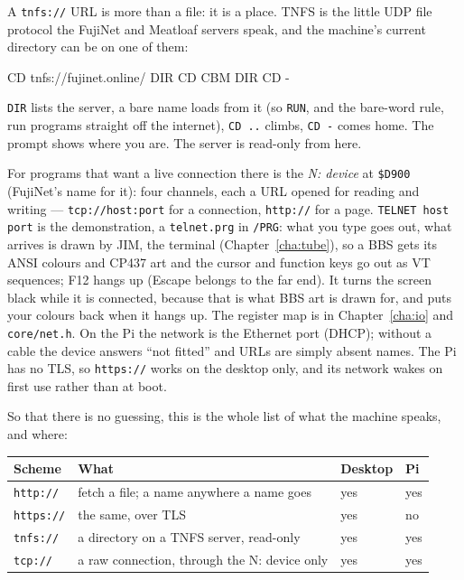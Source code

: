 A \texttt{tnfs://} URL is more than a file: it is a place. TNFS is the
little UDP file protocol the FujiNet and Meatloaf servers speak, and the
machine's current directory can be on one of them:

\begin{type}
CD tnfs://fujinet.online/
DIR
CD CBM
DIR
CD -
\end{type}

\verb|DIR| lists the server, a bare name loads from it (so \verb|RUN|, and
the bare-word rule, run programs straight off the internet), \verb|CD ..|
climbs, \verb|CD -| comes home. The prompt shows where you are. The server
is read-only from here.

For programs that want a live connection there is the \emph{N: device}
at \texttt{\$D900} (FujiNet's name for it): four channels, each a URL
opened for reading and writing --- \texttt{tcp://host:port} for a
connection, \texttt{http://} for a page. \verb|TELNET host port| is the
demonstration, a \texttt{telnet.prg} in \texttt{/PRG}: what you type goes
out, what arrives is drawn by JIM, the terminal (Chapter~\ref{cha:tube}),
so a BBS gets its ANSI colours and CP437 art and the cursor and function
keys go out as VT sequences; F12 hangs up (Escape belongs to the far end).
It turns the screen black while it is connected, because that is what
BBS art is drawn for, and puts your colours back when it hangs up.
The register map is in
Chapter~\ref{cha:io} and \texttt{core/net.h}. On the Pi the network is
the Ethernet port (DHCP); without a cable the device answers ``not
fitted'' and URLs are simply absent names. The Pi has no TLS, so
\texttt{https://} works on the desktop only, and its network wakes on
first use rather than at boot.

So that there is no guessing, this is the whole list of what the machine
speaks, and where:

\begin{center}
\small
\begin{tabular}{@{}l l l l@{}}
\toprule
\textbf{Scheme} & \textbf{What} & \textbf{Desktop} & \textbf{Pi} \\
\midrule
\texttt{http://} & fetch a file; a name anywhere a name goes & yes & yes \\
\texttt{https://} & the same, over TLS & yes & no \\
\texttt{tnfs://} & a directory on a TNFS server, read-only & yes & yes \\
\texttt{tcp://} & a raw connection, through the N: device only & yes & yes \\
\bottomrule
\end{tabular}
\end{center}


